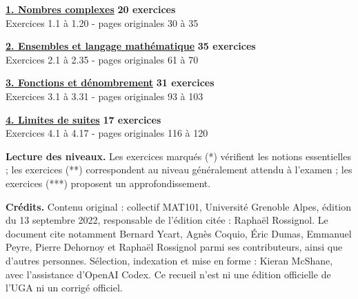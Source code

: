 \documentclass[11pt,a4paper]{article}
\newcommand{\chapterlink}[4]{%
  \par\medskip
  \colorbox{soft}{%
    \parbox{\dimexpr\linewidth-2\fboxsep\relax}{%
      \vspace{0.25em}
      \textbf{\hyperref[#1]{#2}}\hfill
      \textcolor{accent}{\textbf{#3 exercices}}\\[0.2em]
      \textcolor{muted}{#4}
      \vspace{0.25em}
    }%
  }%
}
\begin{document}
\chapterlink{complexes}{1. Nombres complexes}{20}
  {Exercices 1.1 à 1.20 - pages originales 30 à 35}

\chapterlink{ensembles}{2. Ensembles et langage mathématique}{35}
  {Exercices 2.1 à 2.35 - pages originales 61 à 70}

\chapterlink{fonctions}{3. Fonctions et dénombrement}{31}
  {Exercices 3.1 à 3.31 - pages originales 93 à 103}

\chapterlink{limites}{4. Limites de suites}{17}
  {Exercices 4.1 à 4.17 - pages originales 116 à 120}

\vfill
\textbf{Lecture des niveaux.}
Les exercices marqués (*) vérifient les notions essentielles ; les exercices
(**) correspondent au niveau généralement attendu à l'examen ; les exercices
(***) proposent un approfondissement.

\medskip
\textbf{Crédits.}
Contenu original : collectif MAT101, Université Grenoble Alpes, édition du
13 septembre 2022, responsable de l'édition citée : Raphaël Rossignol.
Le document cite notamment Bernard Ycart, Agnès Coquio, Éric Dumas, Emmanuel
Peyre, Pierre Dehornoy et Raphaël Rossignol parmi ses contributeurs, ainsi que
d'autres personnes. Sélection, indexation et mise en forme : Kieran McShane,
avec l'assistance d'OpenAI Codex. Ce recueil n'est ni une édition officielle
de l'UGA ni un corrigé officiel.

\clearpage
{}
\label{complexes}


\label{ensembles}


\label{fonctions}


\label{limites}

\end{document}
